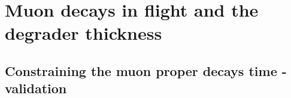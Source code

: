 \section {Muon decays in flight and the degrader thickness}


\subsection {Constraining the muon proper decays time - validation}




